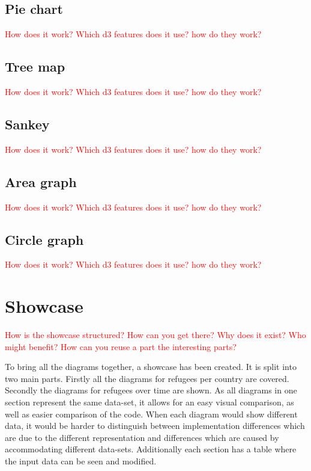 \subsection{Pie chart}
\textcolor{red}{
How does it work? Which d3 features does it use? how do they work?}

\subsection{Tree map}
\textcolor{red}{
How does it work? Which d3 features does it use? how do they work?}

\subsection{Sankey}
\textcolor{red}{
How does it work? Which d3 features does it use? how do they work?}

\subsection{Area graph}
\textcolor{red}{
How does it work? Which d3 features does it use? how do they work?}

\subsection{Circle graph}
\textcolor{red}{
How does it work? Which d3 features does it use? how do they work?}


\section{Showcase}
\textcolor{red}{
How is the showcase structured? How can you get there? Why does it exist? Who might benefit? How can you reuse a part the interesting parts?}

To bring all the diagrams together, a showcase has been created. It  is split into two main parts. Firstly all the diagrams for refugees per country are covered. Secondly the diagrams for refugees over time are shown. As all diagrams in one section represent the same data-set, it allows for an easy visual comparison, as well as easier comparison of the code. When each diagram would show different data, it would be harder to distinguish between implementation differences which are due to the different representation and differences which are caused by accommodating different data-sets. Additionally each section has a table where the input data can be seen and modified.


